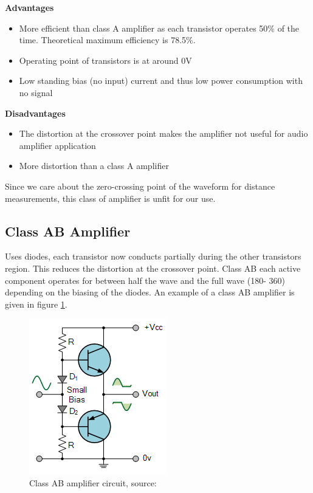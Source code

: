 \documentclass[12pt, a4paper]{article}
\begin{document}
	\textbf{Advantages}
	\begin{itemize}
		\item More efficient than class A amplifier as each transistor operates 50\% of the time. Theoretical maximum efficiency is 78.5\%.
		\item Operating point of transistors is at around 0V
		\item Low standing bias (no input) current and thus low power consumption with no signal
	\end{itemize}

	\textbf{Disadvantages}
	\begin{itemize}
		\item The distortion at the crossover point makes the amplifier not useful for audio amplifier application
		\item More distortion than a class A amplifier

	\end{itemize}
	Since we care about the zero-crossing point of the waveform for distance measurements, this class of amplifier is unfit for our use. 
	\pagebreak
	\subsection{Class AB Amplifier}
	Uses diodes, each transistor now conducts partially during the other transistors region. This reduces the distortion at the crossover point. Class AB each active component operates for between half the wave and the full wave (180\degree - 360\degree) depending on the biasing of the diodes. An example of a class AB amplifier is given in figure \ref{fig:classABAmplifier}.\\
	\begin{figure} [!htb]
		\hfill\includegraphics{./Figures/class_AB_amplifier}\hspace*{\fill}	
		\caption{Class AB amplifier circuit, source: \cite{amplifiers}}
		\label{fig:classABAmplifier}
	\end{figure}
	
\end{document}
